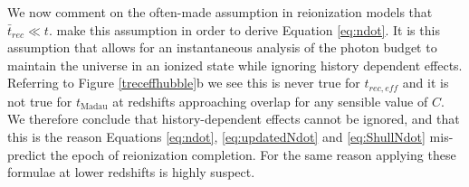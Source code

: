 We now comment on the often-made assumption in reionization models that $\bar{t}_{rec} \ll t$. \cite{MadauEtAl1999} make this assumption in order to derive Equation \eqref{eq:ndot}. It is this assumption that allows for an instantaneous analysis of the photon budget to maintain the universe in an ionized state while ignoring history dependent effects.
Referring to  Figure \ref{treceffhubble}b we see this is never true for $t_{rec,eff}$ and it is not true for $t_\mathrm{Madau}$ at redshifts approaching overlap for any sensible value of $C$. We therefore conclude that history-dependent effects cannot be ignored, and that this is the reason Equations \eqref{eq:ndot}, \eqref{eq:updatedNdot} and \eqref{eq:ShullNdot} mis-predict the epoch of reionization completion. For the same reason applying these formulae at lower redshifts is highly suspect.  




